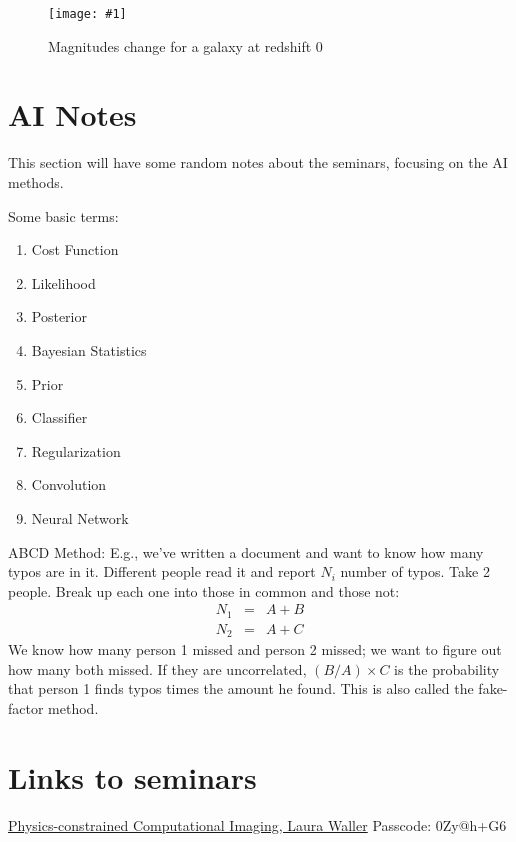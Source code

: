 \documentclass[prd,amsmath,aps,floats,amssymb, floatfix,
  superscriptaddress,nofootinbib]{revtex4-1}
\newcommand{\sfig}[2]{
\texttt{[image: \#1]}
        }
\newcommand{\Spng}[2]{
    \begin{figure}[thbp]
    \sfig{Figures/#1.png}{0.65\columnwidth}
    \caption{{\small #2}}
    \label{fig:#1}
    \end{figure}
}
\def\vs{\nonumber\\}
\numberwithin{equation}{section}
\def\bea{\begin{eqnarray}}
\def\eea{\end{eqnarray}}
\newcommand\bee{\begin{enumerate}}
\newcommand\eee{\end{enumerate}}
\begin{document}
\Spng{photoz0}{Magnitudes change for a galaxy at redshift 0}


 
 \appendix
 
  
 \section{AI Notes}\label{sec:unblind}
 This section will have some random notes about the seminars, focusing on the AI methods. 
 
 Some basic terms:
 \bee
 \item Cost Function
 \item Likelihood
 \item Posterior
 \item Bayesian Statistics
 \item Prior
 \item Classifier
 \item Regularization
 \item Convolution
 \item Neural Network
  \eee
  
  ABCD Method: E.g., we've written a document and want to know how many typos are in it. Different people read it and report $N_i$ number of typos. Take 2 people. Break up each one into those in common and those not:
  \bea
  N_1&=&A+B\vs
  N_2&=&A+C
  \eea
  We know how many person 1 missed and person 2 missed; we want to figure out how many both missed. If they are uncorrelated, $(B/A)\times C$ is the probability that person 1 finds typos times the amount he found. This is also called the fake-factor method.
 
 \section{Links to seminars}
 
 \href{https://cmu.zoom.us/rec/share/2m9MSmtj6mbf7A_ueusvKnZIFItFV3HPI7QVJ7zlfSCCZGRzBt3iTHKs_fcKLJKx.3rNWZExDpw63YeTg}{Physics-constrained Computational Imaging, Laura Waller} Passcode: 0Zy@h+G6
\end{document}
